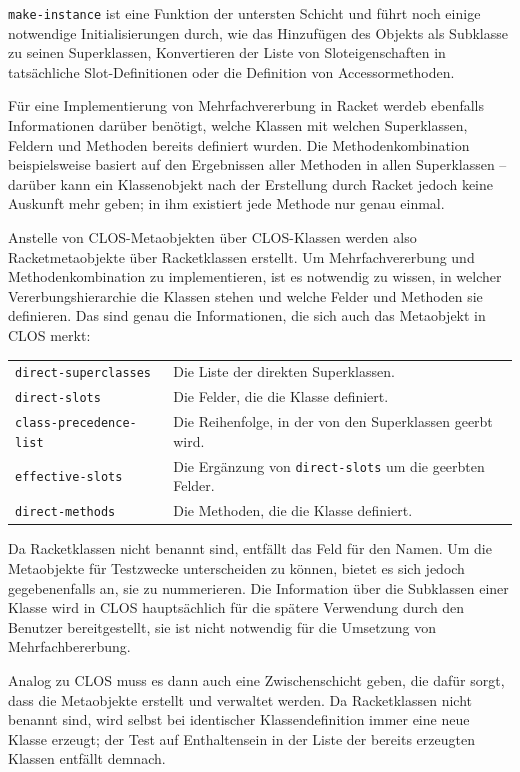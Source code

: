 \texttt{make-instance} ist eine Funktion der untersten Schicht und führt noch einige notwendige Initialisierungen durch, wie das Hinzufügen des Objekts als Subklasse zu seinen Superklassen, Konvertieren der Liste von Sloteigenschaften in tatsächliche Slot-Definitionen oder die Definition von Accessormethoden. 

Für eine Implementierung von Mehrfachvererbung in Racket werdeb ebenfalls Informationen darüber benötigt, welche Klassen mit welchen Superklassen, Feldern und Methoden bereits definiert wurden. Die Methodenkombination beispielsweise basiert auf den Ergebnissen aller Methoden in allen Superklassen -- darüber kann ein Klassenobjekt nach der Erstellung durch Racket jedoch keine Auskunft mehr geben; in ihm existiert jede Methode nur genau einmal.

Anstelle von CLOS-Metaobjekten über CLOS-Klassen werden also Racketmetaobjekte über Racketklassen erstellt. Um Mehrfachvererbung und Methodenkombination zu implementieren, ist es notwendig zu wissen, in welcher Vererbungshierarchie die Klassen stehen und welche Felder und Methoden sie definieren. Das sind genau die Informationen, die sich auch das Metaobjekt in CLOS merkt:

\begin{tabular}{p{5cm}p{9cm}}
 \texttt{direct-superclasses} & Die Liste der direkten Superklassen. \\
 \texttt{direct-slots} & Die Felder, die die Klasse definiert. \\
 \texttt{class-precedence-list} & Die Reihenfolge, in der von den Superklassen geerbt wird.\\
 \texttt{effective-slots} & Die Ergänzung von \texttt{direct-slots} um die geerbten Felder. \\
 \texttt{direct-methods} & Die Methoden, die die Klasse definiert.
\end{tabular}

Da Racketklassen nicht benannt sind, entfällt das Feld für den Namen. Um die Metaobjekte für Testzwecke unterscheiden zu können, bietet es sich jedoch gegebenenfalls an, sie zu nummerieren. Die Information über die Subklassen einer Klasse wird in CLOS hauptsächlich für die spätere Verwendung durch den Benutzer bereitgestellt, sie ist nicht notwendig für die Umsetzung von Mehrfachbererbung. 

Analog zu CLOS muss es dann auch eine Zwischenschicht geben, die dafür sorgt, dass die Metaobjekte erstellt und verwaltet werden. Da Racketklassen nicht benannt sind, wird selbst bei identischer Klassendefinition immer eine neue Klasse erzeugt; der Test auf Enthaltensein in der Liste der bereits erzeugten Klassen entfällt demnach.

